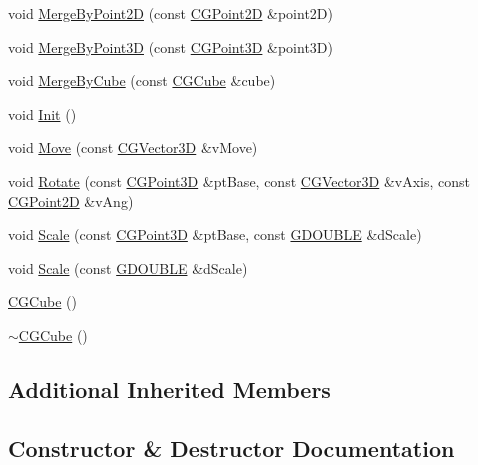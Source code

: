 \begin{DoxyCompactItemize}
\item 
void \hyperlink{class_c_g_cube_af968a70ffea3d06c2e2743f8e5abc740}{Merge\+By\+Point2\+D} (const \hyperlink{class_c_g_point2_d}{C\+G\+Point2\+D} \&point2\+D)
\item 
void \hyperlink{class_c_g_cube_a610487ab8928bab293b154361255c60b}{Merge\+By\+Point3\+D} (const \hyperlink{class_c_g_point3_d}{C\+G\+Point3\+D} \&point3\+D)
\item 
void \hyperlink{class_c_g_cube_ac55054028368849f42da19cbe895c572}{Merge\+By\+Cube} (const \hyperlink{class_c_g_cube}{C\+G\+Cube} \&cube)
\item 
void \hyperlink{class_c_g_cube_a29785f2c1a031d3bd36703b01a018f3c}{Init} ()
\item 
void \hyperlink{class_c_g_cube_a43c92533d72a3c783a935c323b0919e6}{Move} (const \hyperlink{_g_point3_d_8h_aa7e73d39f4c991acb5a13c84b498366d}{C\+G\+Vector3\+D} \&v\+Move)
\item 
void \hyperlink{class_c_g_cube_a5f5f8e17052de555634368f2bb0c65aa}{Rotate} (const \hyperlink{class_c_g_point3_d}{C\+G\+Point3\+D} \&pt\+Base, const \hyperlink{_g_point3_d_8h_aa7e73d39f4c991acb5a13c84b498366d}{C\+G\+Vector3\+D} \&v\+Axis, const \hyperlink{class_c_g_point2_d}{C\+G\+Point2\+D} \&v\+Ang)
\item 
void \hyperlink{class_c_g_cube_ae30ac6c0ee3b50c1f4f1177e6caa2524}{Scale} (const \hyperlink{class_c_g_point3_d}{C\+G\+Point3\+D} \&pt\+Base, const \hyperlink{_g_types_8h_afd05ac85f90ee8e2a733928545462cd4}{G\+D\+O\+U\+B\+L\+E} \&d\+Scale)
\item 
void \hyperlink{class_c_g_cube_ab4403a88b996a380b9d28f7f0e16e17d}{Scale} (const \hyperlink{_g_types_8h_afd05ac85f90ee8e2a733928545462cd4}{G\+D\+O\+U\+B\+L\+E} \&d\+Scale)
\item 
\hyperlink{class_c_g_cube_a60523a14d899f8ab497b671b18951a73}{C\+G\+Cube} ()
\item 
\hyperlink{class_c_g_cube_a6573b301fa9fff892e28c65d8599ea02}{$\sim$\+C\+G\+Cube} ()
\end{DoxyCompactItemize}
\subsection*{Additional Inherited Members}


\subsection{Constructor \& Destructor Documentation}
\hypertarget{class_c_g_cube_a60523a14d899f8ab497b671b18951a73}{}
